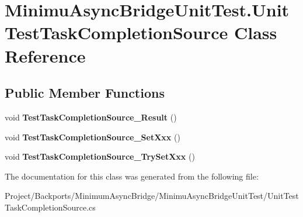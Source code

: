 \hypertarget{class_minimu_async_bridge_unit_test_1_1_unit_test_task_completion_source}{}\section{Minimu\+Async\+Bridge\+Unit\+Test.\+Unit\+Test\+Task\+Completion\+Source Class Reference}
\label{class_minimu_async_bridge_unit_test_1_1_unit_test_task_completion_source}
\subsection*{Public Member Functions}
\begin{DoxyCompactItemize}
\item 
\mbox{\label{class_minimu_async_bridge_unit_test_1_1_unit_test_task_completion_source_a73b5fe2c512266ccc060074cf23c553d}} 
void {\bfseries Test\+Task\+Completion\+Source\+\_\+\+Result} ()
\item 
\mbox{\label{class_minimu_async_bridge_unit_test_1_1_unit_test_task_completion_source_afaab0886bf548c5cd5173ef84e3913ac}} 
void {\bfseries Test\+Task\+Completion\+Source\+\_\+\+Set\+Xxx} ()
\item 
\mbox{\label{class_minimu_async_bridge_unit_test_1_1_unit_test_task_completion_source_ab9b0c4fd85ed08adcae235ddae7a6a92}} 
void {\bfseries Test\+Task\+Completion\+Source\+\_\+\+Try\+Set\+Xxx} ()
\end{DoxyCompactItemize}


The documentation for this class was generated from the following file\+:\begin{DoxyCompactItemize}
\item 
Project/\+Backports/\+Minimum\+Async\+Bridge/\+Minimu\+Async\+Bridge\+Unit\+Test/Unit\+Test\+Task\+Completion\+Source.\+cs\end{DoxyCompactItemize}
